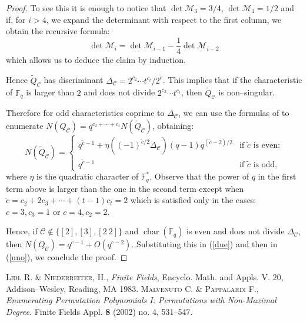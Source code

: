 \documentclass{amsart}
\newcommand{\F}{\mathbb F_q}
\begin{document}
\begin{proof}
To see this it is enough to notice that $\det \mathcal M_3=3/4$,
$\det\mathcal M_4=1/2$ and if, for $i>4$, we expand the determinant
with respect to the first column, we obtain the recursive formula:
$$\det\mathcal M_i=\det\mathcal M_{i-1}-\frac14\det\mathcal M_{i-2}$$
which allows us to deduce the claim by induction.

Hence $\tilde{Q}_\mathcal C$ has discriminant $\Delta_\mathcal
C=2^{c_2}\cdots t^{c_t}/2^{\tilde{c}}$. This implies that if the
characteristic of $\F$ is larger than $2$ and does not divide
$2^{c_2}\cdots t^{c_t}$, then $\tilde{Q}_\mathcal C$ is
non--singular.

Therefore for odd characteristics coprime to $\Delta_\mathcal C$, we can use the
formulas of \cite[Theorems 6.26 and 6.27]{LN} to enumerate
$N(Q_\mathcal C)=q^{c_2+\cdots+c_t}N(\tilde{Q}_\mathcal C)$,
obtaining:
$$N(\tilde{Q}_\mathcal C)=\begin{cases}q^{\tilde{c}-1}+
\eta((-1)^{\tilde{c}/2}\Delta_\mathcal C)
(q-1)q^{(\tilde{c}-2)/2}&\text{if $\tilde{c}$ is even;}\\
q^{\tilde{c}-1} & \text{if $\tilde{c}$ is odd,}\end{cases}$$ where
$\eta$ is the quadratic character of $\F^*$. Observe that the power
of $q$ in the first term above is larger than the one in the second
term except when $\tilde{c}=c_2+2c_3+\cdots+ (t-1)c_t=2$ which is
satisfied only in the cases: $c=3,c_3=1$ or $c=4,c_2=2$.

Hence, if $\mathcal C\not\in\{[2],[3],[2\ 2]\}$ and
$\operatorname{char}(\F)$ is even and does not divide
$\Delta_\mathcal C$, then $N(Q_\mathcal C)=q^{c-1}+O(q^{c-2})$.
Substituting this in (\ref{due}) and then in (\ref{uno}), we
conclude the proof.\end{proof}

\begin{thebibliography}{99}
 \textsc{Lidl R. \& Niederreiter, H.}, \textit{Finite Fields},
Encyclo. Math. and Appls. V. 20, Addison--Wesley, Reading, MA 1983.
 \textsc{Malvenuto C. \& Pappalardi F.},
\textit{Enumerating Permutation Polynomials I: Permutations with
Non-Maximal Degree}. Finite Fields Appl. \textbf{8} (2002) no. 4,
531--547.
\end{thebibliography}
\end{document}
